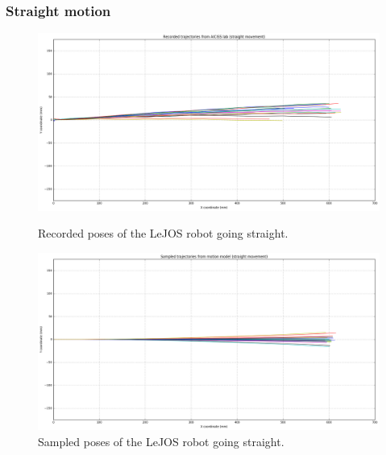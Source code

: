\documentclass[paper=a4, fontsize=11pt]{scrartcl} %
\begin{document}
    \subsubsection*{Straight motion}
    \begin{figure}[H]
        \centering
        \begin{minipage}{\textwidth}
            \centering
            \includegraphics[width=1\textwidth]{images/recorded_poses_straight.png} %
            \caption{Recorded poses of the LeJOS robot going straight.}
        \end{minipage}\hfill
        \begin{minipage}{\textwidth}
            \centering
            \includegraphics[width=1\textwidth]{images/sampled_poses_straight.png} %
            \caption{Sampled poses of the LeJOS robot going straight.}
        \end{minipage}
    \end{figure}
\end{document}
